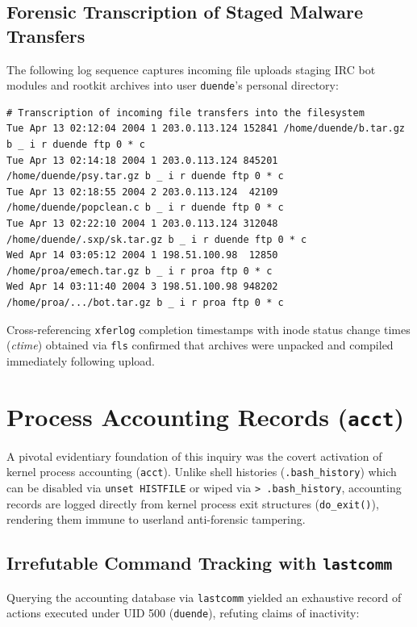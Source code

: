 \subsection{Forensic Transcription of Staged Malware Transfers}

The following log sequence captures incoming file uploads staging IRC bot modules and rootkit archives into user \texttt{duende}'s personal directory:

\begin{lstlisting}[style=terminal]
# Transcription of incoming file transfers into the filesystem
Tue Apr 13 02:12:04 2004 1 203.0.113.124 152841 /home/duende/b.tar.gz b _ i r duende ftp 0 * c
Tue Apr 13 02:14:18 2004 1 203.0.113.124 845201 /home/duende/psy.tar.gz b _ i r duende ftp 0 * c
Tue Apr 13 02:18:55 2004 2 203.0.113.124  42109 /home/duende/popclean.c b _ i r duende ftp 0 * c
Tue Apr 13 02:22:10 2004 1 203.0.113.124 312048 /home/duende/.sxp/sk.tar.gz b _ i r duende ftp 0 * c
Wed Apr 14 03:05:12 2004 1 198.51.100.98  12850 /home/proa/emech.tar.gz b _ i r proa ftp 0 * c
Wed Apr 14 03:11:40 2004 3 198.51.100.98 948202 /home/proa/.../bot.tar.gz b _ i r proa ftp 0 * c
\end{lstlisting}

Cross-referencing \texttt{xferlog} completion timestamps with inode status change times (\textit{ctime}) obtained via \texttt{fls} confirmed that archives were unpacked and compiled immediately following upload.

\section{Process Accounting Records (\texttt{acct})}

A pivotal evidentiary foundation of this inquiry was the covert activation of kernel process accounting (\texttt{acct}). Unlike shell histories (\texttt{.bash\_history}) which can be disabled via \texttt{unset HISTFILE} or wiped via \texttt{> .bash\_history}, accounting records are logged directly from kernel process exit structures (\texttt{do\_exit()}), rendering them immune to userland anti-forensic tampering.

\subsection{Irrefutable Command Tracking with \texttt{lastcomm}}

Querying the accounting database via \texttt{lastcomm} yielded an exhaustive record of actions executed under UID 500 (\texttt{duende}), refuting claims of inactivity:

